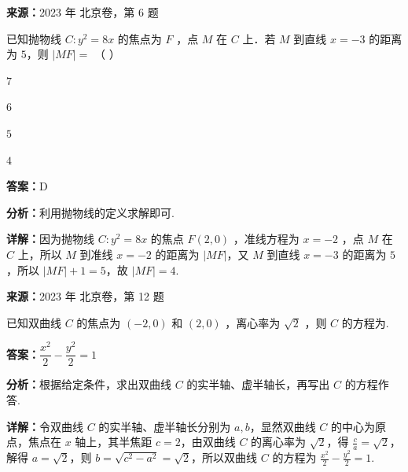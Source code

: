 \begin{question}[points=4]
\textbf{来源：}2023 年 北京卷，第 6 题\par
已知抛物线 $C: y^2 = 8x$ 的焦点为 $F$ ，点 $M$ 在 $C$ 上．若 $M$ 到直线 $x = -3$ 的距离为 $5$，则 $|MF| =$ （ ）
\begin{choices}
  \item $7$
  \item $6$
  \item $5$
  \item $4$
\end{choices}
\begin{solution}
\textbf{答案：}D

\textbf{分析：}利用抛物线的定义求解即可.

\textbf{详解：}因为抛物线 $C: y^2 = 8x$ 的焦点 $F(2,0)$ ，准线方程为 $x = -2$ ，点 $M$ 在 $C$ 上，所以 $M$ 到准线 $x = -2$ 的距离为 $|MF|$，又 $M$ 到直线 $x = -3$ 的距离为 $5$，所以 $|MF| + 1 = 5$，故 $|MF| = 4$.
\end{solution}
\end{question}

\begin{question}[points=5]
\textbf{来源：}2023 年 北京卷，第 12 题\par
已知双曲线 $C$ 的焦点为 $(-2,0)$ 和 $(2,0)$ ，离心率为 $\sqrt{2}$ ，则 $C$ 的方程为.
\fillin[{$\dfrac{x^2}{2} - \dfrac{y^2}{2} = 1$}]
\begin{solution}
\textbf{答案：}$\dfrac{x^2}{2} - \dfrac{y^2}{2} = 1$

\textbf{分析：}根据给定条件，求出双曲线 $C$ 的实半轴、虚半轴长，再写出 $C$ 的方程作答.

\textbf{详解：}令双曲线 $C$ 的实半轴、虚半轴长分别为 $a,b$，显然双曲线 $C$ 的中心为原点，焦点在 $x$ 轴上，其半焦距 $c=2$，由双曲线 $C$ 的离心率为 $\sqrt{2}$，得 $\frac{c}{a}=\sqrt{2}$，解得 $a=\sqrt{2}$，则 $b=\sqrt{c^2-a^2}=\sqrt{2}$，所以双曲线 $C$ 的方程为 $\frac{x^2}{2}-\frac{y^2}{2}=1$.
\end{solution}
\end{question}

